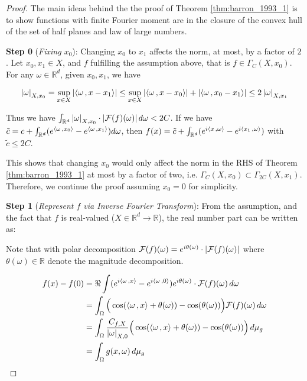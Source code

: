 \begin{proof}

    The main ideas behind the the proof of Theorem \ref{thm:barron_1993_1} is to
    show functions with finite Fourier moment are in the closure of the convex
    hull of the set of half planes and law of large numbers.

    \textbf{Step 0} (\textit{Fixing $x_0$}): Changing $x_0$ to $x_1$ affects the
    norm, at most, by a factor of $2$. Let $x_0, x_1 \in X$, and $f$ fulfilling
    the assumption above, that is $f \in \Gamma_C(X, x_0)$. For any $\omega \in
        \mathbb{R}^d$, given $x_0, x_1$, we have

    \begin{equation}
        \left| \omega \right|_{X, x_0} = \sup_{x\in X}\left| \left\langle \omega\, , x-x_1 \right\rangle \right| \leq \sup_{x\in X}\left| \left\langle \omega\, , x-x_0 \right\rangle \right| + \left| \left\langle \omega\, , x_0-x_1 \right\rangle \right| \leq 2\left| \omega \right|_{X, x_1}
    \end{equation}

    Thus we have $\int_{\mathbb{R}^d} \left| \omega \right|_{X, x_0} \cdot
        \left| \mathcal{F}(f)(\omega) \right| d\omega < 2C$. If we have $\tilde{c} = c +
        \int_{\mathbb{R}^d} (e^{\left\langle \omega\, , x_0 \right\rangle} - e^{\left\langle \omega\, , x_1 \right\rangle})
        d\omega$, then $f(x) = \tilde{c} + \int_{\mathbb{R}^d}
        (e^{i\left\langle x\, , \omega \right\rangle} - e^{i\left\langle x_1\, , \omega \right\rangle})$ with $\tilde{c} \leq
        2C$.

    This shows that changing $x_0$ would only affect the norm in the RHS of
    Theorem \ref{thm:barron_1993_1} at most by a factor of two, i.e.
    $\Gamma_C(X, x_0) \subset \Gamma_{2C}(X, x_1)$. Therefore, we continue the
    proof assuming $x_0 = 0$ for simplicity.

    \textbf{Step 1} (\textit{Represent $f$ via Inverse Fourier Transform}): From
    the assumption, and the fact that $f$ is real-valued ($X \in \mathbb{R}^d
        \to \mathbb{R}$), the real number part can be written as:

    Note that with polar decomposition $\mathcal{F}(f)(\omega) =
        e^{i\theta(\omega)} \cdot \left| \mathcal{F}(f)(\omega) \right|$ where $\theta(\omega) \in
        \mathbb{R}$ denote the magnitude decomposition.

    \begin{align}
        f(x) - f(0)
         & = \Re \int (e^{i\left\langle \omega\, , x \right\rangle} - e^{i\left\langle \omega\, , 0 \right\rangle}) e^{i\theta(\omega)} \cdot 
         \mathcal{F}(f)(\omega)\,d\omega                              \\
         & = \int_{\Omega}\Big(\cos(\left\langle \omega\, , x \right\rangle + \theta(\omega)) - \cos(\theta(\omega))\Big)
         \mathcal{F}(f)(\omega)\,d\omega \\
         & = \int_{\Omega} \frac{C_{f,X}}{\left| \omega \right|_{X, 0}}\Big(\cos(\left\langle \omega\, , x \right\rangle + \theta
         (\omega)) - \cos(\theta(\omega))\Big)\,d\mu_g \\
         & = \int_{\Omega} g(x, \omega)\,d\mu_g \label{eq:barron_fouier_int}
    \end{align}


\end{proof}
